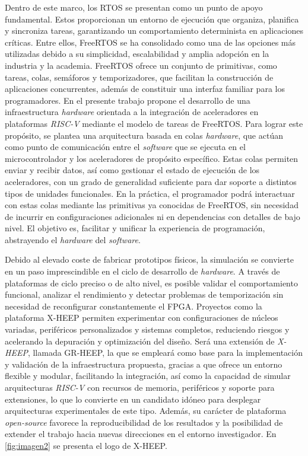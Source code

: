 Dentro de este marco, los \ac{RTOS} se presentan como un punto de apoyo fundamental. Estos proporcionan un entorno de ejecución que organiza, planifica y sincroniza tareas, garantizando un comportamiento determinista en aplicaciones críticas. Entre ellos, FreeRTOS se ha consolidado como una de las opciones más utilizadas debido a su simplicidad, escalabilidad y amplia adopción en la industria y la academia. FreeRTOS ofrece un conjunto de primitivas, como tareas, colas, semáforos y temporizadores, que facilitan la construcción de aplicaciones concurrentes, además de constituir una interfaz familiar para los programadores. En el presente trabajo propone el desarrollo de una infraestructura \textit{hardware} orientada a la integración de aceleradores en plataformas \textit{RISC-V} mediante el modelo de tareas de FreeRTOS. Para lograr este propósito, se plantea una arquitectura basada en colas \textit{hardware}, que actúan como punto de comunicación entre el \textit{software} que se ejecuta en el microcontrolador y los aceleradores de propósito específico. Estas colas permiten enviar y recibir datos, así como gestionar el estado de ejecución de los aceleradores, con un grado de generalidad suficiente para dar soporte a distintos tipos de unidades funcionales. En la práctica, el programador podrá interactuar con estas colas mediante las primitivas ya conocidas de FreeRTOS, sin necesidad de incurrir en configuraciones adicionales ni en dependencias con detalles de bajo nivel. El objetivo es, facilitar y unificar la experiencia de programación, abstrayendo el \textit{hardware} del \textit{software}.

Debido al elevado coste de fabricar prototipos físicos, la simulación se convierte en un paso imprescindible en el ciclo de desarrollo de \textit{hardware}. A través de plataformas de ciclo preciso o de alto nivel, es posible validar el comportamiento funcional, analizar el rendimiento y detectar problemas de temporización sin necesidad de reconfigurar constantemente el FPGA. Proyectos como la plataforma \ac{X-HEEP} permiten experimentar con configuraciones de núcleos variadas, periféricos personalizados y sistemas completos, reduciendo riesgos y acelerando la depuración y optimización del diseño. Será una extensión de \textit{X-HEEP}, llamada \ac{GR-HEEP}, la que se empleará como base para la implementación y validación de la infraestructura propuesta, gracias a que ofrece un entorno flexible y modular, facilitando la integración, así como la capacidad de simular arquitecturas \textit{RISC-V} con recursos de memoria, periféricos y soporte para extensiones, lo que lo convierte en un candidato idóneo para desplegar arquitecturas experimentales de este tipo. Además, su carácter de plataforma \emph{open-source} favorece la reproducibilidad de los resultados y la posibilidad de extender el trabajo hacia nuevas direcciones en el entorno investigador. En \ref{fig:imagen2} se presenta el logo de X-HEEP.  

